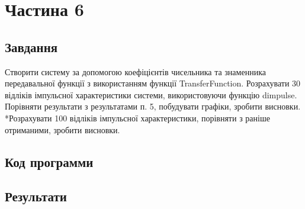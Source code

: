 \section{Частина 6}
\label{sec:task6}

\subsection{Завдання}
\label{subsec:task6_task}

Створити систему за допомогою коефіцієнтів чисельника та
знаменника передавальної функції з використанням функції TransferFunction.
Розрахувати 30 відліків імпульсної характеристики системи, використовуючи
функцію dimpulse. Порівняти результати з результатами п. 5, побудувати
графіки, зробити висновки.
*Розрахувати 100 відліків імпульсної характеристики, порівняти з
раніше отриманими, зробити висновки.

\subsection{Код программи}
\label{subsec:task6_code}

\subsection{Результати}
\label{subsec:task6_results}
